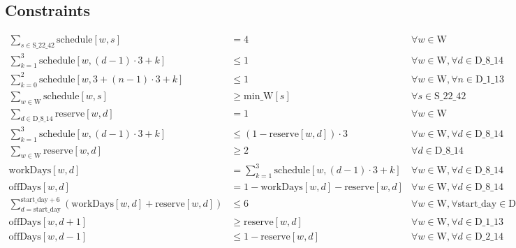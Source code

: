 \documentclass{article}
\begin{document}
\subsection*{Constraints}
\begin{align*}
\sum_{s \in \text{S\_22\_42}} \text{schedule}[w, s] &= 4 & \forall w \in \text{W} \\
\sum_{k=1}^{3} \text{schedule}[w, (d-1) \cdot 3 + k] &\leq 1 & \forall w \in \text{W}, \forall d \in \text{D\_8\_14} \\
\sum_{k=0}^{2} \text{schedule}[w, 3 + (n-1) \cdot 3 + k] &\leq 1 & \forall w \in \text{W}, \forall n \in \text{D\_1\_13} \\
\sum_{w \in \text{W}} \text{schedule}[w, s] &\geq \text{min\_W}[s] & \forall s \in \text{S\_22\_42} \\
\sum_{d \in \text{D\_8\_14}} \text{reserve}[w, d] &= 1 & \forall w \in \text{W} \\
\sum_{k=1}^{3} \text{schedule}[w, (d-1) \cdot 3 + k] &\leq (1 - \text{reserve}[w, d]) \cdot 3 & \forall w \in \text{W}, \forall d \in \text{D\_8\_14} \\
\sum_{w \in \text{W}} \text{reserve}[w, d] &\geq 2 & \forall d \in \text{D\_8\_14} \\
\text{workDays}[w, d] &= \sum_{k=1}^{3} \text{schedule}[w, (d-1) \cdot 3 + k] & \forall w \in \text{W}, \forall d \in \text{D\_8\_14} \\
\text{offDays}[w, d] &= 1 - \text{workDays}[w, d] - \text{reserve}[w, d] & \forall w \in \text{W}, \forall d \in \text{D\_8\_14} \\
\sum_{d = \text{start\_day}}^{\text{start\_day}+6} (\text{workDays}[w, d] + \text{reserve}[w, d]) &\leq 6 & \forall w \in \text{W}, \forall \text{start\_day} \in \text{D\_1\_8} \\
\text{offDays}[w, d + 1] &\geq \text{reserve}[w, d] & \forall w \in \text{W}, \forall d \in \text{D\_1\_13} \\
\text{offDays}[w, d - 1] &\leq 1 - \text{reserve}[w, d] & \forall w \in \text{W}, \forall d \in \text{D\_2\_14}
\end{align*}
\end{document}
